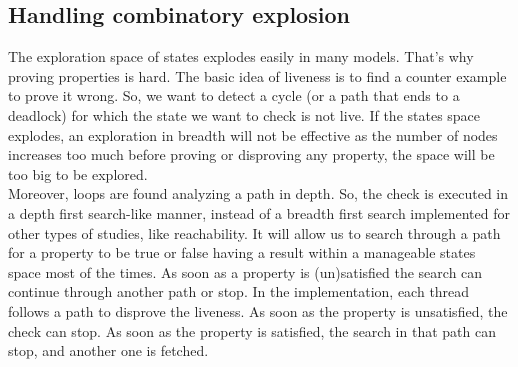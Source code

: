 \documentclass[12pt]{article}
\begin{document}
\subsection{Handling combinatory explosion}
The exploration space of states explodes easily in many models. That's why proving properties is hard. The basic idea of liveness is to find a counter example to prove it wrong. So, we want to detect a cycle (or a path that ends to a deadlock) for which the state we want to check is not live. If the states space explodes, an exploration in breadth will not be effective as the number of nodes increases too much before proving or disproving any property, the space will be too big to be explored.\\

Moreover, loops are found analyzing a path in depth. So, the check is executed in a depth first search-like manner, instead of a breadth first search implemented for other types of studies, like reachability. It will allow us to search through a path for a property to be true or false having a result within a manageable states  space most of the times. As soon as a property is (un)satisfied the search can continue through another path or stop. In the implementation, each thread follows a path to disprove the liveness. As soon as the property is unsatisfied, the check can stop. As soon as the property is satisfied, the search in that path can stop, and another one is fetched.\\
\end{document}
